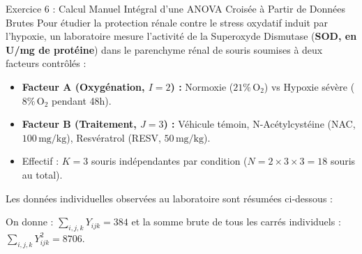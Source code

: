 \documentclass[11pt,a4paper]{article}
\begin{document}
\begin{exercicebox}{Exercice 6 : Calcul Manuel Intégral d'une ANOVA Croisée à Partir de Données Brutes}
Pour étudier la protection rénale contre le stress oxydatif induit par l'hypoxie, un laboratoire mesure l'activité de la Superoxyde Dismutase (\textbf{SOD, en U/mg de protéine}) dans le parenchyme rénal de souris soumises à deux facteurs contrôlés :
\begin{itemize}
  \item \textbf{Facteur A (Oxygénation, $I = 2$) :} Normoxie ($21\%\,\text{O}_2$) vs Hypoxie sévère ($8\%\,\text{O}_2$ pendant 48h).
  \item \textbf{Facteur B (Traitement, $J = 3$) :} Véhicule témoin, N-Acétylcystéine (NAC, $100\,\text{mg/kg}$), Resvératrol (RESV, $50\,\text{mg/kg}$).
  \item Effectif : $K = 3$ souris indépendantes par condition ($N = 2 \times 3 \times 3 = 18$ souris au total).
\end{itemize}

Les données individuelles observées au laboratoire sont résumées ci-dessous :
\begin{center}
\end{center}
On donne : $\sum_{i,j,k} Y_{ijk} = 384$ et la somme brute de tous les carrés individuels : $\sum_{i,j,k} Y_{ijk}^2 = 8706$.


\end{exercicebox}
\end{document}
